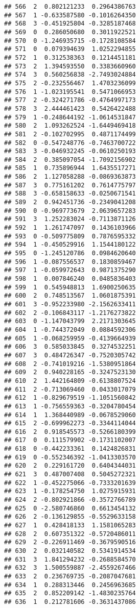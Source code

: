 \documentclass[
]{article}
\begin{document}
\begin{verbatim}
## 566  2  0.802121233  0.2964386763
## 567  1 -0.633587580 -0.1016264350
## 568  3 -0.451925804 -0.3285187468
## 569  0  0.286050680  0.3011922521
## 570  0 -1.246935715 -0.1728108584
## 571  0  0.079394639  1.0252294855
## 572  1  0.312538363  0.1214451181
## 573  2  1.394593550  0.3383660960
## 574  3  0.560256838 -2.7493024884
## 575  2 -0.232556467  1.4703236099
## 576  1 -1.023195541  0.5471066953
## 577  2 -0.324271786 -0.4764997173
## 578  3  2.444461423  0.5426422488
## 579  1 -0.248644192 -1.0614531847
## 580  2  1.093262524 -1.6449469418
## 581  2 -0.102702995  0.4871174499
## 582  0 -0.547248776 -0.7463700722
## 583  3 -0.046932245 -0.0610250193
## 584  2  0.385097054 -1.7092156902
## 585  1  0.735896944  1.6435517271
## 586  2  1.127058288 -0.0869363873
## 587  3  0.775161202  0.7614775797
## 588  3 -0.658158633 -0.0250671541
## 589  2  0.942451736 -0.2349041208
## 590  0 -0.969773679  2.0639657283
## 591  3  1.252283024 -0.7113871126
## 592  1  1.261747097  0.1436103966
## 593  0 -0.509775809  0.7876595332
## 594  1 -0.450529916  1.1544180122
## 595  0 -1.245120786  0.0984620640
## 596  1 -0.087556537  0.1830859467
## 597  1 -0.059972643  0.9871375290
## 598  1  0.007846240  0.0485836403
## 599  1  0.545948813  1.6900250635
## 600  2  0.748513567  1.0601875391
## 601  3 -0.952233980 -2.1562633411
## 602  2 -0.106843117 -1.2176273822
## 603  0 -1.147043799  2.2171303645
## 604  1 -0.744372049  0.0884592306
## 605  1 -0.068259959 -0.4139664939
## 606  3  0.585033845  0.3274532251
## 607  3  0.484726347 -0.7520305742
## 608  2 -0.741019216 -1.5380951864
## 609  2  0.940228165 -0.3247523130
## 610  2  1.442164809 -0.6138807524
## 611  2 -0.713069460  0.0433017079
## 612  1 -0.829679519 -1.1051560842
## 613  1 -0.756559363 -0.3204780454
## 614  1  1.368440989 -0.0678529060
## 615  2 -0.699962273 -0.3344114044
## 616  2  0.918545573 -0.5266180399
## 617  0  0.111579902 -0.1731102007
## 618  0 -0.442233361  0.1424826831
## 619  0 -0.552346392 -1.0413303570
## 620  2  0.229161720  0.6404344031
## 621  3  0.487007408  0.5045272321
## 622  1 -0.452275066 -0.7333201639
## 623  1 -0.178254750  1.0275915931
## 624  2 -0.802921866 -0.3572766789
## 625  0 -2.580746860  0.6613454132
## 626  2 -0.136129855 -0.5529633158
## 627  1  0.428418133  1.1581065283
## 628  2  0.607351322 -0.5720486011
## 629  2 -0.226911469 -0.3679590516
## 630  2  0.032140582  0.5341914534
## 631  3  1.841294232 -0.2688584570
## 632  3  1.500559887 -2.4559267466
## 633  2  0.236769735 -0.2087047681
## 634  1  0.288313446  0.2456963685
## 635  2  0.852209142 -1.4830235764
## 636  1  0.212781606 -0.3631437086

\end{verbatim}
\end{document}
